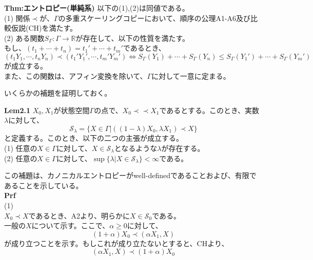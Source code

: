 \documentclass[a4paper,11pt]{jsarticle}
\numberwithin{equation}{section}
\begin{document}
\begin{itembox}[l]{\textbf{Thm:エントロピー(単純系)}}
    以下の(1),(2)は同値である。\\
    (1) 関係$\prec$が、$\Gamma$の多重スケーリングコピーにおいて、順序の公理A1-A6及び比較仮説(CH)を満たす。\\
    (2) ある関数$S_{\Gamma}:\Gamma \rightarrow \mathbb{R}$が存在して、以下の性質を満たす。\\
    もし、$(t_1+ \cdots +t_n)=t_1'+ \cdots +t_m'$であるとき、
    \begin{equation}
        (t_1 Y_1, \cdots ,t_n Y_n) \prec (t_1' Y_1', \cdots ,t_m' Y_m') \Leftrightarrow S_{\Gamma}(Y_1)+ \cdots +S_{\Gamma}(Y_n) \leq S_{\Gamma}(Y_1')+ \cdots +S_{\Gamma}(Y_m')
    \end{equation}
    が成立する。\\
    また、この関数は、アフィン変換を除いて、$\Gamma$に対して一意に定まる。

\end{itembox}
いくらかの補題を証明しておく。\\
\begin{itembox}[l]{\textbf{Lem2.1}}
$X_0,X_1$が状態空間$\Gamma$の点で、$X_0 \prec \prec X_1$であるとする。このとき、実数$\lambda$に対して、
\begin{equation}
    \mathcal{S}_{\lambda} = \{X\in \Gamma|((1-\lambda)X_0,\lambda X_1) \prec X \}
\end{equation}
と定義する。このとき、以下の二つの主張が成立する。\\
(1) 任意の$X \in \Gamma$に対して、$X \in \mathcal{S}_{\lambda}$となるような$\lambda$が存在する。\\
(2) 任意の$X \in \Gamma$に対して、$\sup\{\lambda|X \in \mathcal{S}_{\lambda}\}<\infty$である。

\end{itembox}
この補題は、カノニカルエントロピーがwell-definedであることおよび、有限であることを示している。\\
\textbf{Prf}\\
(1) \\
$X_0 \prec X$であるとき、A2より、明らかに$X \in \mathcal{S}_0$である。\\
一般の$X$について示す。ここで、$\alpha \geq 0$に対して、
\begin{equation}
    (1+\alpha)X_0 \prec (\alpha X_1,X)
\end{equation}
が成り立つことを示す。もしこれが成り立たないとすると、CHより、
\begin{equation}
    (\alpha X_1,X) \prec (1+\alpha)X_0
\end{equation}
\end{document}
